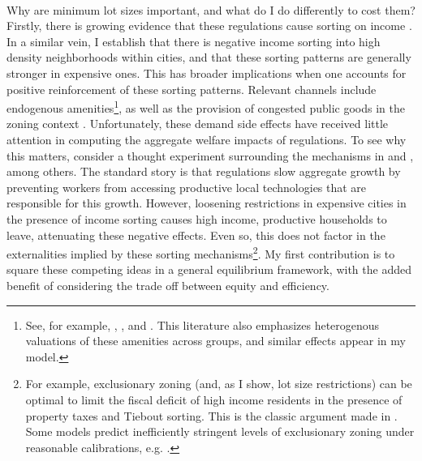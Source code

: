 \documentclass[]{article}
\begin{document}
\paragraph*{}
Why are minimum lot sizes important, and what do I do differently to cost them? Firstly, there is growing evidence that these regulations cause sorting on income \citep{kulka} \citep{Song}. In a similar vein, I establish that there is negative income sorting into high density neighborhoods within cities, and that these sorting patterns are generally stronger in expensive ones. This has broader implications when one accounts for positive reinforcement of these sorting patterns. Relevant channels include endogenous amenities\footnote{See, for example, \cite{Coutureetal}, \cite{AlmagroDI}, \cite{diamond2016} and \cite{bshartley2020}. This literature also emphasizes heterogenous valuations of these amenities across groups, and similar effects appear in my model.}, as well as the provision of congested public goods in the zoning context \citep{calabresetal} \citep{ineffTiebout}. Unfortunately, these demand side effects have received little attention in computing the aggregate welfare impacts of regulations. To see why this matters, consider a thought experiment surrounding the mechanisms in \cite{hseihmoretti} and \cite{durantonpugaurbgrowth}, among others. The standard story is that regulations slow aggregate growth by preventing workers from accessing productive local technologies that are responsible for this growth. However, loosening restrictions in expensive cities in the presence of income sorting causes high income, productive households to leave, attenuating these negative effects. Even so, this does not factor in the externalities implied by these sorting mechanisms\footnote{For example, exclusionary zoning (and, as I show, lot size restrictions) can be optimal to limit the fiscal deficit of high income residents in the presence of property taxes and Tiebout sorting. This is the classic argument made in \cite{hamilton1976}. Some models predict inefficiently stringent levels of exclusionary zoning under reasonable calibrations, e.g.  \cite{ineffTiebout}.}. My first contribution is to square these competing ideas in a general equilibrium framework, with the added benefit of considering the trade off between equity and efficiency.     
\end{document}
